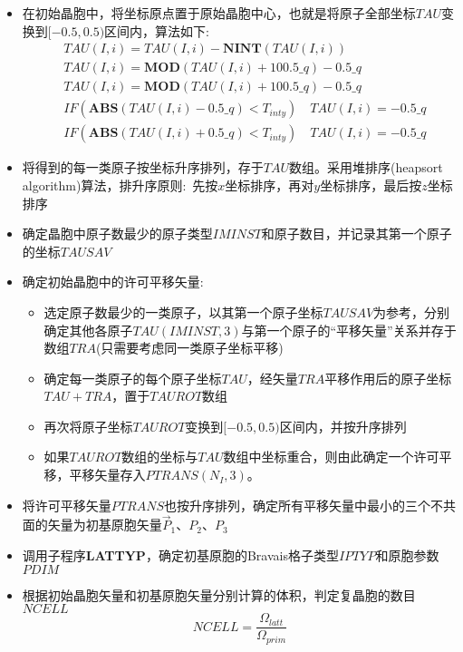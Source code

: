 \documentclass{article}      %
\begin{document}
\begin{itemize}
	\item 在初始晶胞中，将坐标原点置于原始晶胞中心，也就是将原子全部坐标$\mathit{TAU}$变换到$[-0.5,0.5)$区间内，算法如下:
			\begin{displaymath}
				\begin{aligned}
					&TAU(I,i)=TAU(I,i)-\mathbf{NINT}(TAU(I,i)) \\
					&TAU(I,i)=\mathbf{MOD}(TAU(I,i)+100.5\_q)-0.5\_q \\
					&TAU(I,i)=\mathbf{MOD}(TAU(I,i)+100.5\_q)-0.5\_q \\
					&IF (\mathbf{ABS}(TAU(I,i)-0.5\_q)<T_{inty})\quad TAU(I,i)=-0.5\_q \\
					&IF (\mathbf{ABS}(TAU(I,i)+0.5\_q)<T_{inty})\quad TAU(I,i)=-0.5\_q
				\end{aligned}
			\end{displaymath}
	\item 将得到的每一类原子按坐标升序排列，存于$\mathit{TAU}$数组。采用堆排序\textrm{(heapsort algorithm)}算法，排升序原则:~先按$x$坐标排序，再对$y$坐标排序，最后按$z$坐标排序
	\item 确定晶胞中原子数最少的原子类型$\mathit{IMINST}$和原子数目，并记录其第一个原子的坐标$\mathit{TAUSAV}$
	\item 确定初始晶胞中的许可平移矢量:~
		\begin{itemize}
			\item 选定原子数最少的一类原子，以其第一个原子坐标$\mathit{TAUSAV}$为参考，分别确定其他各原子$\mathit{TAU}(IMINST,3)$与第一个原子的“平移矢量”关系并存于数组$\mathit{TRA}$(只需要考虑同一类原子坐标平移)
			\item 确定每一类原子的每个原子坐标$\mathit{TAU}$，经矢量$\mathit{TRA}$平移作用后的原子坐标$\mathit{TAU}+\mathit{TRA}$，置于$\mathit{TAUROT}$数组
			\item 再次将原子坐标$\mathit{TAUROT}$变换到$[-0.5,0.5)$区间内，并按升序排列
			\item 如果$\mathit{TAUROT}$数组的坐标与$\mathit{TAU}$数组中坐标重合，则由此确定一个许可平移，平移矢量存入$\mathit{PTRANS}(N_I,3)$。
		\end{itemize}
	\item 将许可平移矢量$\mathit{PTRANS}$也按升序排列，确定所有平移矢量中最小的三个不共面的矢量为初基原胞矢量$\vec P_1$、$P_2$、$P_3$
	\item 调用子程序\textbf{LATTYP}，确定初基原胞的\textrm{Bravais}格子类型$\mathit{IPTYP}$和原胞参数$\mathit{PDIM}$
        \item 根据初始晶胞矢量和初基原胞矢量分别计算的体积，判定复晶胞的数目$\mathit{NCELL}$
\begin{displaymath}
	\mathit{NCELL}=\dfrac{\Omega_{latt}}{\Omega_{prim}}
\end{displaymath}
\end{itemize}
\end{document}
